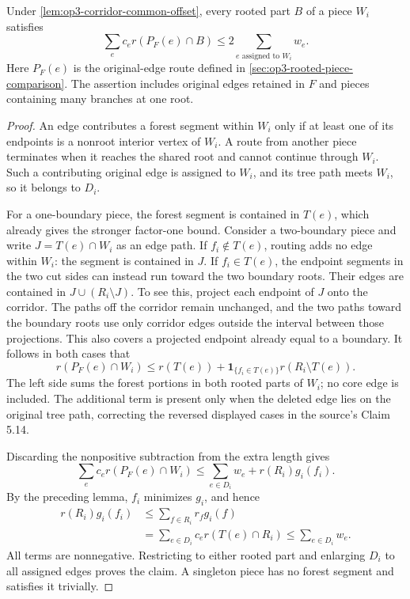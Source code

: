 \begin{lemma}
\label{lem:op3-corridor-owned-stretch}
Under \cref{lem:op3-corridor-common-offset}, every rooted part $B$
of a piece $W_i$ satisfies
\[
 \sum_e c_e r(P_F(e)\cap B)
 \leq 2\sum_{e\text{ assigned to }W_i}w_e.
\]
Here $P_F(e)$ is the original-edge route defined in
\cref{sec:op3-rooted-piece-comparison}. The assertion includes original
edges retained in $F$ and pieces containing many branches at one root.
\end{lemma}
\begin{proof}
An edge contributes a forest segment within $W_i$ only if at least one
of its endpoints is a nonroot interior vertex of $W_i$. A route from
another piece terminates when it reaches the shared root and cannot
continue through $W_i$. Such a contributing original edge is assigned
to $W_i$, and its tree path meets $W_i$, so it belongs to $D_i$.

For a one-boundary piece, the forest segment is contained in $T(e)$,
which already gives the stronger factor-one bound. Consider a
two-boundary piece and write $J=T(e)\cap W_i$ as an edge path.
If $f_i\notin T(e)$, routing adds no edge within $W_i$: the segment
is contained in $J$. If $f_i\in T(e)$, the endpoint segments in the
two cut sides can instead run toward the two boundary roots. Their
edges are contained in $J\cup(R_i\setminus J)$. To see this, project
each endpoint of $J$ onto the corridor. The paths off the corridor
remain unchanged, and the two paths toward the boundary roots use
only corridor edges outside the interval between those projections.
This also covers a projected endpoint already equal to a boundary.
It follows in both cases that
\[
 r(P_F(e)\cap W_i)
 \leq r(T(e))+
       \boldsymbol{1}_{\{f_i\in T(e)\}}r(R_i\setminus T(e)).
\]
The left side sums the forest portions in both rooted parts of $W_i$;
no core edge is included. The additional term is present only when
the deleted edge lies on the original tree path, correcting the
reversed displayed cases in the source's Claim 5.14.

Discarding the nonpositive subtraction from the extra length gives
\[
 \sum_e c_e r(P_F(e)\cap W_i)
 \leq\sum_{e\in D_i}w_e+r(R_i)g_i(f_i).
\]
By the preceding lemma, $f_i$ minimizes $g_i$, and hence
\[
 \begin{split}
 r(R_i)g_i(f_i)
 &\leq\sum_{f\in R_i}r_f g_i(f)\\
 &=\sum_{e\in D_i}c_e r(T(e)\cap R_i)
 \leq\sum_{e\in D_i}w_e.
 \end{split}
\]
All terms are nonnegative. Restricting to either rooted part and
enlarging $D_i$ to all assigned edges proves the claim. A singleton
piece has no forest segment and satisfies it trivially.
\end{proof}

